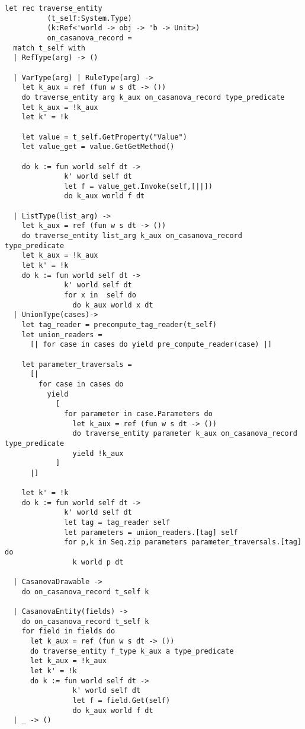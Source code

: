 
\begin{lstlisting}
let rec traverse_entity 
          (t_self:System.Type) 
          (k:Ref<'world -> obj -> 'b -> Unit>) 
          on_casanova_record = 
  match t_self with
  | RefType(arg) -> ()

  | VarType(arg) | RuleType(arg) ->
    let k_aux = ref (fun w s dt -> ())
    do traverse_entity arg k_aux on_casanova_record type_predicate
    let k_aux = !k_aux
    let k' = !k

    let value = t_self.GetProperty("Value")                
    let value_get = value.GetGetMethod()

    do k := fun world self dt ->
              k' world self dt
              let f = value_get.Invoke(self,[||])
              do k_aux world f dt
    
  | ListType(list_arg) -> 
    let k_aux = ref (fun w s dt -> ())
    do traverse_entity list_arg k_aux on_casanova_record type_predicate
    let k_aux = !k_aux
    let k' = !k
    do k := fun world self dt ->
              k' world self dt
              for x in  self do
                do k_aux world x dt
  | UnionType(cases)->
    let tag_reader = precompute_tag_reader(t_self)
    let union_readers = 
      [| for case in cases do yield pre_compute_reader(case) |]

    let parameter_traversals = 
      [|
        for case in cases do             
          yield
            [
              for parameter in case.Parameters do
                let k_aux = ref (fun w s dt -> ())
                do traverse_entity parameter k_aux on_casanova_record type_predicate
                yield !k_aux
            ]
      |]
    
    let k' = !k
    do k := fun world self dt ->
              k' world self dt
              let tag = tag_reader self
              let parameters = union_readers.[tag] self
              for p,k in Seq.zip parameters parameter_traversals.[tag] do
                k world p dt
    
  | CasanovaDrawable ->
    do on_casanova_record t_self k

  | CasanovaEntity(fields) ->
    do on_casanova_record t_self k
    for field in fields do
      let k_aux = ref (fun w s dt -> ())
      do traverse_entity f_type k_aux a type_predicate
      let k_aux = !k_aux
      let k' = !k
      do k := fun world self dt ->
                k' world self dt
                let f = field.Get(self)
                do k_aux world f dt
  | _ -> ()
\end{lstlisting}

